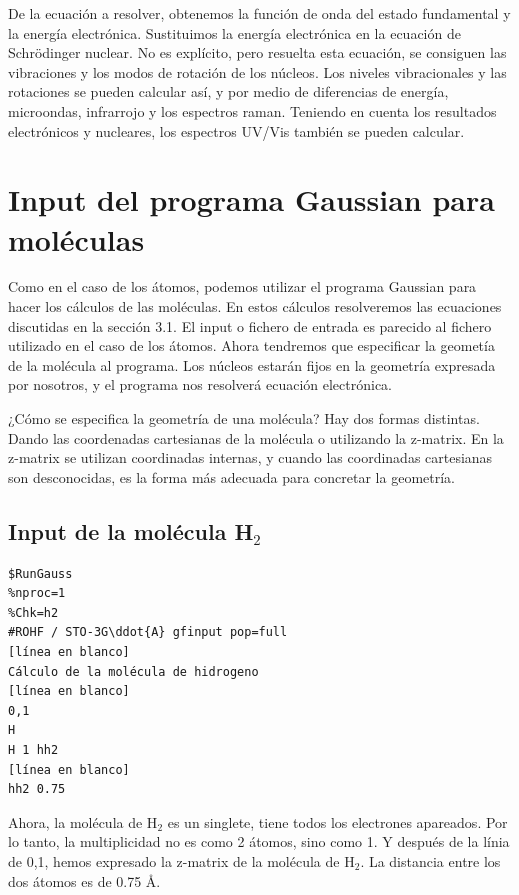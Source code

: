 \documentclass{tufte-book}
\begin{document}
De la ecuación a resolver, obtenemos la función de onda del estado fundamental y la energía electrónica. Sustituimos la energía electrónica en la ecuación de Schrödinger nuclear. No es explícito, pero resuelta esta ecuación, se consiguen las vibraciones y los modos de rotación de los núcleos. Los niveles vibracionales y las rotaciones se pueden calcular así, y por medio de diferencias de energía, microondas, infrarrojo y los espectros raman. Teniendo en cuenta los resultados electrónicos y nucleares, los espectros UV/Vis también se pueden calcular.

\section{Input del programa Gaussian para moléculas}

Como en el caso de los átomos, podemos utilizar el programa Gaussian para hacer los cálculos de las moléculas. En estos cálculos resolveremos las ecuaciones discutidas en la sección 3.1. El input o fichero de entrada es parecido al fichero utilizado en el caso de los átomos. Ahora tendremos que especificar la geometía de la molécula al programa. Los núcleos estarán fijos en la geometría expresada por nosotros, y el programa nos resolverá ecuación electrónica.

¿Cómo se especifica la geometría de una molécula? Hay dos formas distintas. Dando las coordenadas cartesianas de la molécula o utilizando la z-matrix. En la z-matrix se utilizan coordinadas internas, y cuando las coordinadas cartesianas son desconocidas, es la forma más adecuada para concretar la geometría.

\subsection{Input de la molécula H$_2$}

\begin{verbatim}
$RunGauss
%nproc=1
%Chk=h2
#ROHF / STO-3G\ddot{A} gfinput pop=full
[línea en blanco]
Cálculo de la molécula de hidrogeno 
[línea en blanco] 
0,1
H
H 1 hh2
[línea en blanco]
hh2 0.75
\end{verbatim}

Ahora, la molécula de H$_2$ es un singlete, tiene todos los electrones apareados. Por lo tanto, la multiplicidad no es como 2 átomos, sino como 1. Y después de la línia de 0,1, hemos expresado la z-matrix de la molécula de H$_2$. La distancia entre los dos átomos es de 0.75 \r{A}.
\end{document}
